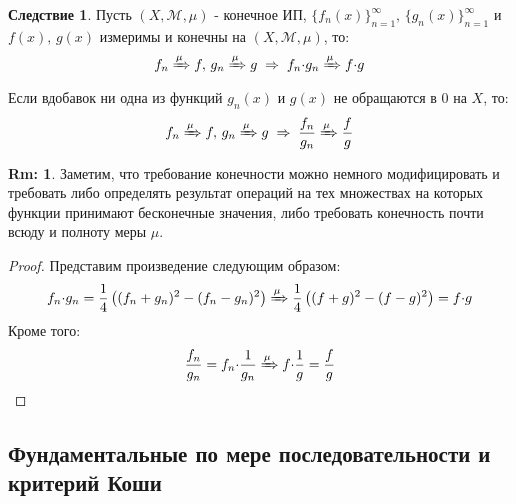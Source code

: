 \documentclass[12pt]{article}
\newcommand{\MM}{\mathcal{M}}
\theoremstyle{definition}
\newtheorem{rem}{Rm:}
\newtheorem{corollary}{Следствие}
\begin{document}
\begin{corollary}
	Пусть $(X,\MM,\mu)$ - конечное ИП, $\{f_n(x)\}_{n = 1}^{\infty}, \, \{g_n(x)\}_{n = 1}^{\infty}$ и $f(x), \, g(x)$ измеримы и конечны на $(X, \MM,\mu)$, то: 
	$$
		f_n \xRightarrow{\mu} f, \, g_n \xRightarrow{\mu} g \; \Rightarrow \; f_n{\cdot}g_n \xRightarrow{\mu} f{\cdot}g
	$$
	Если вдобавок ни одна из функций $g_n(x)$ и $g(x)$ не обращаются в $0$ на $X$, то: 
	$$
		f_n \xRightarrow{\mu} f, \, g_n \xRightarrow{\mu} g \; \Rightarrow  \;\dfrac{f_n}{g_n} \xRightarrow{\mu}\dfrac{f}{g}
	$$
\end{corollary}
\begin{rem}
	Заметим, что требование конечности можно немного модифицировать и требовать либо определять результат операций на тех множествах на которых функции принимают бесконечные значения, либо требовать конечность почти всюду и полноту меры $\mu$.
\end{rem}
\begin{proof}
	Представим произведение следующим образом:
	$$
		f_n{\cdot}g_n = \dfrac{1}{4}\left((f_n + g_n)^2 - (f_n - g_n)^2\right) \xRightarrow{\mu} \dfrac{1}{4}\left((f+g)^2 - (f - g)^2\right) = f{\cdot}g
	$$
	Кроме того:
	$$
		\dfrac{f_n}{g_n} = f_n{\cdot}\dfrac{1}{g_n} \xRightarrow{\mu} f{\cdot}\dfrac{1}{g} = \dfrac{f}{g}
	$$
\end{proof}

\subsection*{Фундаментальные по мере последовательности и критерий Коши}
\end{document}
